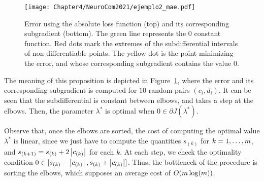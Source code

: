 \begin{figure}[t!]
    \centering
    \texttt{[image: Chapter4/NeuroCom2021/ejemplo2\_mae.pdf]}
    \caption{Error using the absolute loss function (top) and its corresponding subgradient (bottom). The green line represents the $0$ constant function. Red dots mark the extremes of the subdifferential intervals of non-differentiable points. The yellow dot is the point minimizing the error, and whose corresponding subgradient contains the value $0$.}
    \label{fig:abs_error}
\end{figure}
The meaning of this proposition is depicted in Figure~\ref{fig:abs_error}, where the error and its corresponding subgradient is computed for $10$ random pairs $(c_i, d_i)$. It can be seen that the subdifferential is constant between elbows, and takes a step at the elbows. Then, the parameter $\lambda^*$ is optimal when $0 \in \partial J(\lambda^*)$.

Observe that, once the elbows are sorted, the cost of computing the optimal value $\lambda^*$ is linear, since we just have to compute the quantities $s_{(k)}$ for $k=1, \ldots, m$, and $s_{(k+1)} = s_{(k)} + 2 \left|c_{(k)}\right|$  for each $k$. At each step, we check the optimality condition $0 \in [s_{(k)} - \left|c_{(k)}\right|, s_{(k)} + \left|c_{(k)}\right|]$.
Thus, the bottleneck of the procedure is sorting the elbows, which supposes an average cost of $O(m \log(m))$.


